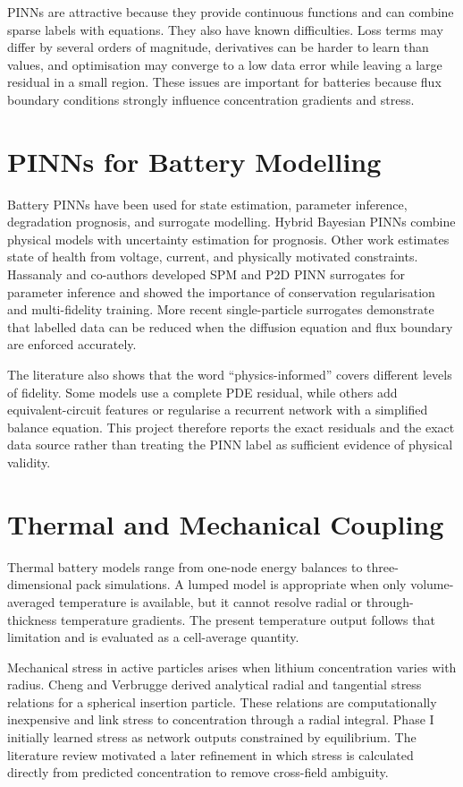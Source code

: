 \documentclass[14pt,a4paper,oneside]{extreport}
\begin{document}
PINNs are attractive because they provide continuous functions and can combine sparse labels with equations. They also have known difficulties. Loss terms may differ by several orders of magnitude, derivatives can be harder to learn than values, and optimisation may converge to a low data error while leaving a large residual in a small region. These issues are important for batteries because flux boundary conditions strongly influence concentration gradients and stress.

\section{PINNs for Battery Modelling}
Battery PINNs have been used for state estimation, parameter inference, degradation prognosis, and surrogate modelling. Hybrid Bayesian PINNs combine physical models with uncertainty estimation for prognosis. Other work estimates state of health from voltage, current, and physically motivated constraints. Hassanaly and co-authors developed SPM and P2D PINN surrogates for parameter inference and showed the importance of conservation regularisation and multi-fidelity training. More recent single-particle surrogates demonstrate that labelled data can be reduced when the diffusion equation and flux boundary are enforced accurately.

The literature also shows that the word ``physics-informed'' covers different levels of fidelity. Some models use a complete PDE residual, while others add equivalent-circuit features or regularise a recurrent network with a simplified balance equation. This project therefore reports the exact residuals and the exact data source rather than treating the PINN label as sufficient evidence of physical validity.

\section{Thermal and Mechanical Coupling}
Thermal battery models range from one-node energy balances to three-dimensional pack simulations. A lumped model is appropriate when only volume-averaged temperature is available, but it cannot resolve radial or through-thickness temperature gradients. The present temperature output follows that limitation and is evaluated as a cell-average quantity.

Mechanical stress in active particles arises when lithium concentration varies with radius. Cheng and Verbrugge derived analytical radial and tangential stress relations for a spherical insertion particle. These relations are computationally inexpensive and link stress to concentration through a radial integral. Phase I initially learned stress as network outputs constrained by equilibrium. The literature review motivated a later refinement in which stress is calculated directly from predicted concentration to remove cross-field ambiguity.
\end{document}
